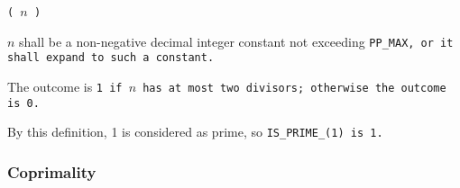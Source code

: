 \def\Subsubsection#1{\subsubsection{#1}
}


 \tt{(} $n$ \tt{)}


$n$ shall be a non-negative decimal integer constant not exceeding \tt{PP_MAX},
or it shall expand to such a constant.


The outcome is \tt{1} if $n$ has at most two divisors;
otherwise the outcome is \tt{0}.

\note By this definition, 1 is considered as prime,
so \tt{IS_PRIME_(1)} is \tt{1}.

\Subsubsection{Coprimality}
